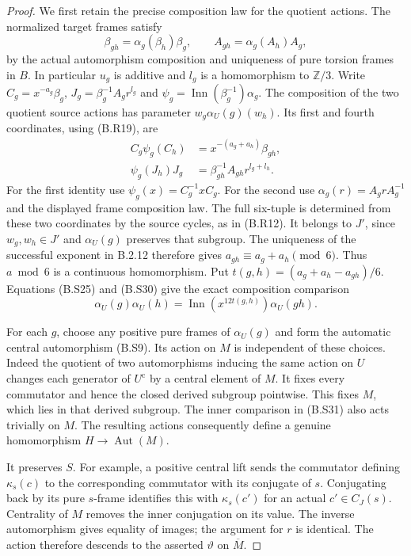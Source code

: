 \begin{proof}
We first retain the precise composition law for the
quotient actions.  The normalized target frames satisfy
\[
 \beta_{gh}=\alpha_g(\beta_h)\beta_g,\qquad
 A_{gh}=\alpha_g(A_h)A_g,
\]
by the actual automorphism composition and uniqueness
of pure torsion frames in $B$.  In particular $u_g$
is additive and $l_g$ is a homomorphism to $\mathbb Z/3$.
Write $C_g=x^{-a_g}\beta_g$,
$J_g=\beta_g^{-1}A_g r^{l_g}$ and
$\psi_g=\operatorname{Inn}(\beta_g^{-1})\alpha_g$.
The composition of the two quotient source actions has
parameter $w_g\alpha_U(g)(w_h)$.  Its first and fourth
coordinates, using (B.R19), are
\[
 \begin{aligned}
 C_g\psi_g(C_h)&=x^{-(a_g+a_h)}\beta_{gh},\\
 \psi_g(J_h)J_g&=\beta_{gh}^{-1}A_{gh}r^{l_g+l_h}.
 \end{aligned}                                                  \tag{B.S30}
\]
For the first identity use
$\psi_g(x)=C_g^{-1}xC_g$.  For the second use
$\alpha_g(r)=A_g r A_g^{-1}$ and the displayed frame
composition law.  The full six-tuple is determined
from these two coordinates by the source cycles, as
in (B.R12).  It belongs to $J'$, since $w_g,w_h\in J'$
and $\alpha_U(g)$ preserves that subgroup.  The uniqueness
of the successful exponent in B.2.12 therefore gives
$a_{gh}\equiv a_g+a_h\pmod6$.  Thus $a\bmod6$ is a
continuous homomorphism.  Put
$t(g,h)=(a_g+a_h-a_{gh})/6$.  Equations (B.S25) and
(B.S30) give the exact composition comparison
\[
 \alpha_U(g)\alpha_U(h)=
      \operatorname{Inn}(x^{12t(g,h)})\alpha_U(gh).              \tag{B.S31}
\]

For each $g$, choose any positive pure frames of
$\alpha_U(g)$ and form the automatic central
automorphism (B.S9).  Its action on $M$ is independent
of these choices.  Indeed the quotient of two
automorphisms inducing the same action on $U$ changes
each generator of $U^{\mathrm c}$ by a central element
of $M$.  It fixes every commutator and hence the
closed derived subgroup pointwise.  This fixes $M$,
which lies in that derived subgroup.  The inner
comparison in (B.S31) also acts trivially on $M$.
The resulting actions consequently define a genuine
homomorphism $H\to\operatorname{Aut}(M)$.

It preserves $S$.  For example, a positive central
lift sends the commutator defining $\kappa_s(c)$ to
the corresponding commutator with its conjugate of
$s$.  Conjugating back by its pure $s$-frame identifies
this with $\kappa_s(c')$ for an actual
$c'\in C_J(s)$.  Centrality of $M$ removes the inner
conjugation on its value.  The inverse automorphism
gives equality of images; the argument for $r$ is
identical.  The action therefore descends to the
asserted $\vartheta$ on $\overline M$.


\end{proof}
